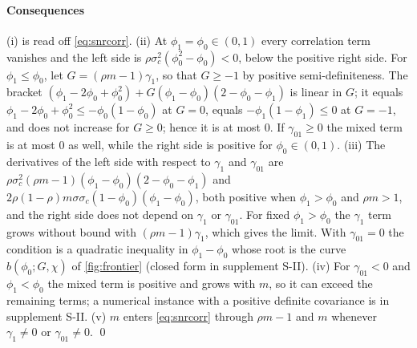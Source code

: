 \paragraph*{Consequences}
(i) is read off \cref{eq:snrcorr}.
(ii) At $\phi_1=\phi_0\in(0,1)$ every correlation term vanishes and the left side is $\rho\sigma_c^2(\phi_0^2-\phi_0)<0$, below the positive
right side.
For $\phi_1\le\phi_0$, let $G=(\rho m-1)\gamma_1$, so that $G\ge-1$ by positive semi-definiteness.
The bracket $(\phi_1-2\phi_0+\phi_0^2)+G(\phi_1-\phi_0)(2-\phi_0-\phi_1)$ is linear in $G$; it equals $\phi_1-2\phi_0+\phi_0^2\le-\phi_0(1-\phi_0)$
at $G=0$, equals $-\phi_1(1-\phi_1)\le0$ at $G=-1$, and does not increase for $G\ge0$; hence it is at most $0$.
If $\gamma_{01}\ge0$ the mixed term is at most $0$ as well, while the right side is positive for $\phi_0\in(0,1)$.
(iii) The derivatives of the left side with respect to $\gamma_1$ and $\gamma_{01}$ are
$\rho\sigma_c^2(\rho m-1)(\phi_1-\phi_0)(2-\phi_0-\phi_1)$ and $2\rho(1-\rho)m\sigma\sigma_c(1-\phi_0)(\phi_1-\phi_0)$, both positive when
$\phi_1>\phi_0$ and $\rho m>1$, and the right side does not depend on $\gamma_1$ or $\gamma_{01}$.
For fixed $\phi_1>\phi_0$ the $\gamma_1$ term grows without bound with $(\rho m-1)\gamma_1$, which gives the limit.
With $\gamma_{01}=0$ the condition is a quadratic inequality in $\phi_1-\phi_0$ whose root is the curve $b(\phi_0;G,\chi)$ of
\cref{fig:frontier} (closed form in supplement S-II).
(iv) For $\gamma_{01}<0$ and $\phi_1<\phi_0$ the mixed term is positive and grows with $m$, so it can exceed the remaining terms; a
numerical instance with a positive definite covariance is in supplement S-II.
(v) $m$ enters \cref{eq:snrcorr} through $\rho m-1$ and $m$ whenever $\gamma_1\neq0$ or $\gamma_{01}\neq0$. \qed

